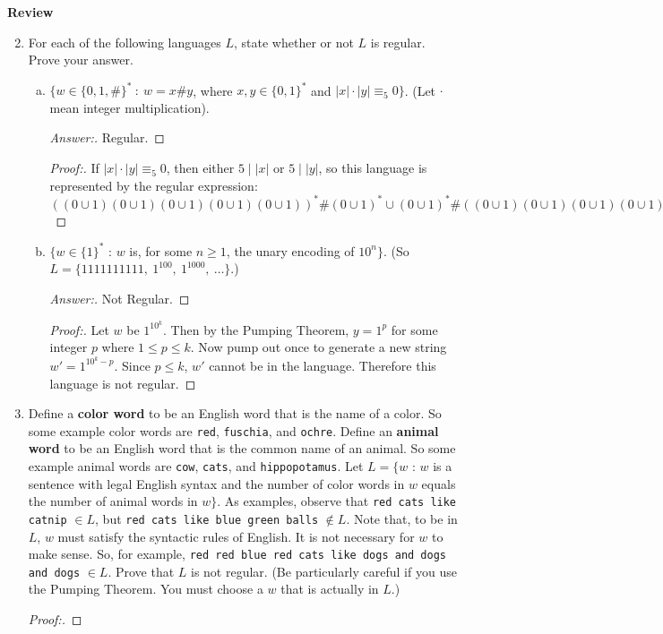 \documentclass[10pt]{article}
\newcommand{\card}[1]{\left| #1 \right|}
\begin{document}
\noindent
\textbf{Review}
\begin{enumerate}[1)]
\setcounter{enumi}{1}

\item
For each of the following languages $L$, state whether or not $L$ is regular. Prove your answer.
\begin{enumerate}[a)]
\item
$\{w \in \{0, 1, \#\}^*\ :\ w = x\#y$, where $x, y \in \{0, 1\}^*$ and $\card{x}\cdot \card{y} \equiv _5 0\}$.  (Let $\cdot$ mean integer multiplication).
\begin{proof}[Answer:]
Regular.
\end{proof}
\begin{proof}[Proof:]
If  $\card{x}\cdot \card{y} \equiv _5 0$, then either $5 \mid \card{x}$ or $5 \mid \card{y}$, so this language is represented by the regular expression: $((0 \cup 1)(0 \cup 1)(0 \cup 1)(0 \cup 1)(0 \cup 1))^*\#(0 \cup 1)^* \cup (0 \cup 1)^*\#((0 \cup 1)(0 \cup 1)(0 \cup 1)(0 \cup 1)(0 \cup 1))^*$
\end{proof}

\item
$\{w \in \{1\}^*$ : $w$ is, for some $n \geq 1$, the unary encoding of $10^n\}$.  (So $L = \{1111111111,\ 1^{100},\ 1^{1000},\ \ldots\}$.)
\begin{proof}[Answer:]
Not Regular.
\end{proof}
\begin{proof}[Proof:]
Let $w$ be $1^{10^k}$.  Then by the Pumping Theorem, $y = 1^p$ for some integer $p$ where $1 \leq p \leq k$.  Now pump out once to generate a new string $w' = 1^{10^k - p}$.  Since $p \leq k$, $w'$ cannot be in the language.  Therefore this language is not regular.
\end{proof}
\end{enumerate}



\item
Define a \textbf{color word} to be an English word that is the name of a color.  So some example color words are \texttt{red}, \texttt{fuschia}, and \texttt{ochre}.  Define an \textbf{animal word} to be an English word that is the common name of an animal.  So some example animal words are \texttt{cow}, \texttt{cats}, and \texttt{hippopotamus}.  Let $L = \{w$ : $w$ is a sentence with legal English syntax and the number of color words in $w$ equals the number of animal words in $w\}$.  As examples, observe that \texttt{red cats like catnip} $\in L$, but \texttt{red cats like blue green balls} $\not \in L$.  Note that, to be in $L$, $w$ must satisfy the syntactic rules of English.  It is not necessary for $w$ to make sense.  So, for example, \texttt{red red blue red cats like dogs and dogs and dogs} $\in L$.  Prove that $L$ is not regular.  (Be particularly careful if you use the Pumping Theorem.  You must choose a $w$ that is actually in $L$.)
\begin{proof}[Proof:]
\end{proof}



\end{enumerate}
\end{document}
